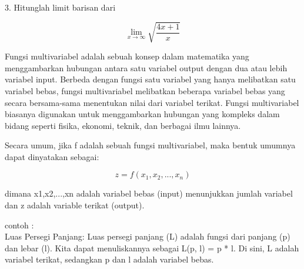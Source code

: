 \documentclass[a4paper,10pt]{article}
\begin{document}
\begin{eulernotebook}
\begin{eulercomment}
\begin{eulercomment}
\begin{eulercomment}
\begin{eulercomment}
\begin{eulercomment}
\begin{eulercomment}
\begin{eulercomment}
\begin{eulercomment}
\begin{eulercomment}
\begin{eulercomment}
\begin{eulercomment}
\begin{eulercomment}
\begin{eulercomment}
\begin{eulercomment}
\begin{eulercomment}
\begin{eulercomment}
\begin{eulercomment}
\begin{eulercomment}
\begin{eulercomment}
\begin{eulercomment}
\begin{eulercomment}
\begin{eulercomment}
\begin{eulercomment}
\begin{eulercomment}
\begin{eulercomment}
\begin{eulercomment}
\begin{eulercomment}
\begin{eulercomment}
\begin{eulercomment}
\begin{eulercomment}
\begin{eulercomment}
3. Hitunglah limit barisan dari\\
\end{eulercomment}
\begin{eulerformula}
\[
\lim_{x\to\infty}\sqrt{\frac{4x+1}{x}}
\]
\end{eulerformula}
\begin{eulercomment}
\begin{eulercomment}
\begin{eulercomment}
Fungsi multivariabel adalah sebuah konsep dalam matematika yang
menggambarkan hubungan antara satu variabel output dengan dua atau
lebih variabel input. Berbeda dengan fungsi satu variabel yang hanya
melibatkan satu variabel bebas, fungsi multivariabel melibatkan
beberapa variabel bebas yang secara bersama-sama menentukan nilai dari
variabel terikat. Fungsi multivariabel biasanya digunakan untuk
menggambarkan hubungan yang kompleks dalam bidang seperti fisika,
ekonomi, teknik, dan berbagai ilmu lainnya.

Secara umum, jika f adalah sebuah fungsi multivariabel, maka bentuk
umumnya dapat dinyatakan sebagai:\\
\end{eulercomment}
\begin{eulerformula}
\[
z=f(x_1,x_2,...,x_n)
\]
\end{eulerformula}
\begin{eulercomment}
dimana x1,x2,...,xn adalah variabel bebas (input) menunjukkan jumlah
variabel dan z adalah variable terikat (output).

contoh :\\
Luas Persegi Panjang: Luas persegi panjang (L) adalah fungsi dari
panjang (p) dan lebar (l). Kita dapat menuliskannya sebagai L(p, l) =
p * l. Di sini, L adalah variabel terikat, sedangkan p dan l adalah
variabel bebas.


\end{eulercomment}
\end{eulercomment}
\end{eulercomment}
\end{eulercomment}
\end{eulercomment}
\end{eulercomment}
\end{eulercomment}
\end{eulercomment}
\end{eulercomment}
\end{eulercomment}
\end{eulercomment}
\end{eulercomment}
\end{eulercomment}
\end{eulercomment}
\end{eulercomment}
\end{eulercomment}
\end{eulercomment}
\end{eulercomment}
\end{eulercomment}
\end{eulercomment}
\end{eulercomment}
\end{eulercomment}
\end{eulercomment}
\end{eulercomment}
\end{eulercomment}
\end{eulercomment}
\end{eulercomment}
\end{eulercomment}
\end{eulercomment}
\end{eulercomment}
\end{eulercomment}
\end{eulercomment}
\end{eulercomment}
\end{eulernotebook}
\end{document}
